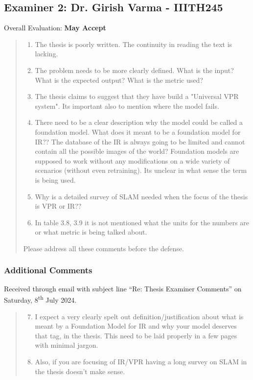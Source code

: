 \subsection{Examiner 2: Dr. Girish Varma - IIITH245}
Overall Evaluation: {\bf May Accept}
\begin{quote}
    \begin{enumerate}
        \item The thesis is poorly written. The continuity in reading
            the text is lacking.
        \item The problem needs to be more clearly defined. What is
            the input? What is the expected output? What is the metric
            used?
        \item The thesis claims to suggest that they have build a
            "Universal VPR system". Its important also to mention
            where the model fails.
        \item There need to be a clear description why the model could
            be called a foundation model. What does it meant to be a
            foundation model for IR?? The database of the IR is always
            going to be limited and cannot contain all the possible
            images of the world? Foundation models are supposed to
            work without any modifications on a wide variety of
            scenarios (without even retraining). Its unclear in what
            sense the term is being used.
        \item Why is a detailed survey of SLAM needed when the focus
            of the thesis is VPR or IR??
        \item In table 3.8, 3.9 it is not mentioned what the units for
            the numbers are or what metric is being talked about.
    \end{enumerate}
    Please address all these comments before the defense.
\end{quote}
\subsubsection{Additional Comments}
Received through email with subject line ``Re: Thesis Examiner
Comments'' on Saturday, 8\textsuperscript{th} July 2024.
\begin{quote}
    \begin{enumerate}
        \setcounter{enumi}{6}
        \item I expect a very clearly spelt out
            definition/justification about what is meant by a
            Foundation Model for IR and why your model deserves that
            tag, in the thesis. This need to be laid properly in a few
            pages with minimal jargon.
        \item Also, if you are focusing of IR/VPR having a long survey
            on SLAM in the thesis doesn't make sense.
    \end{enumerate}
\end{quote}
